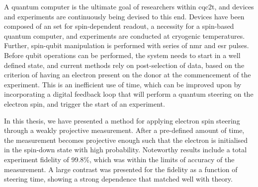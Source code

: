 A quantum computer is the ultimate goal of researchers within \gls{cqc2t}, and devices and experiments are continuously being devised to this end. Devices have been composed of an \gls{set} for spin-dependent readout, a necessity for a spin-based quantum computer, and experiments are conducted at cryogenic temperatures. Further, spin-qubit manipulation is performed with series of \gls{nmr} and \gls{esr} pulses. Before qubit operations can be performed, the system needs to start in a well defined state, and current methods rely on post-selection of data, based on the criterion of having an electron present on the donor at the commencement of the experiment. This is an inefficient use of time, which can be improved upon by incorporating a digital feedback loop that will perform a quantum steering on the electron spin, and trigger the start of an experiment.

In this thesis, we have presented a method for applying electron spin steering through a weakly projective measurement. After a pre-defined amount of time, the measurement becomes projective enough such that the electron is initialised in the spin-down state with high probability. Noteworthy results include a total experiment fidelity of 99.8\%, which was within the limits of accuracy of the measurement. A large contrast was presented for the fidelity as a function of steering time, showing a strong dependence that matched well with theory.

